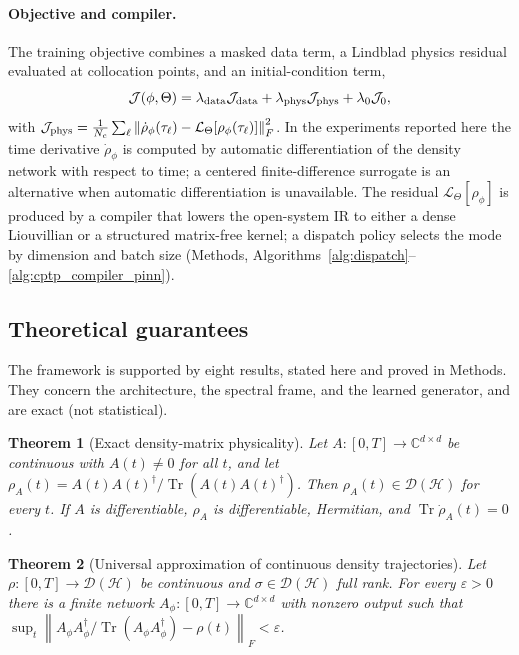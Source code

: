\documentclass[11pt]{article}
\newtheorem{theorem}{Theorem}
\DeclareMathOperator{\Tr}{Tr}
\newcommand{\C}{\mathbb{C}}
\newcommand{\calJ}{\mathcal{J}}
\newcommand{\calD}{\mathcal{D}}
\newcommand{\calL}{\mathcal{L}}
\newcommand{\eps}{\varepsilon}
\newcommand{\norm}[1]{\left\lVert #1 \right\rVert}
\newcommand{\hilb}{\mathcal{H}}
\newcommand{\rhophi}{\rho_{\phi}}
\begin{document}
\paragraph{Objective and compiler.}
The training objective combines a masked data term, a Lindblad physics residual evaluated at collocation points, and an initial-condition term,
\begin{equation}
    \calJ(\phi,\Theta)=\lambda_{\rm data}\calJ_{\rm data}+\lambda_{\rm phys}\calJ_{\rm phys}+\lambda_0\calJ_0,
    \label{eq:pinn_general_loss}
\end{equation}
with $\calJ_{\rm phys}=\tfrac1{N_c}\sum_\ell\norm{\dot\rhophi(\tau_\ell)-\calL_\Theta[\rhophi(\tau_\ell)]}_F^2$. In the experiments reported here the time derivative $\dot\rhophi$ is computed by automatic differentiation of the density network with respect to time; a centered finite-difference surrogate is an alternative when automatic differentiation is unavailable. The residual $\calL_\Theta[\rhophi]$ is produced by a compiler that lowers the open-system IR to either a dense Liouvillian or a structured matrix-free kernel; a dispatch policy selects the mode by dimension and batch size (Methods, Algorithms~\ref{alg:dispatch}--\ref{alg:cptp_compiler_pinn}).

\subsection{Theoretical guarantees}
\label{sec:guarantees}

The framework is supported by eight results, stated here and proved in Methods. They concern the architecture, the spectral frame, and the learned generator, and are exact (not statistical).

\begin{theorem}[Exact density-matrix physicality]
\label{thm:physicality}
Let $A:[0,T]\to\C^{d\times d}$ be continuous with $A(t)\ne0$ for all $t$, and let $\rho_A(t)=A(t)A(t)^\dagger/\Tr(A(t)A(t)^\dagger)$. Then $\rho_A(t)\in\calD(\hilb)$ for every $t$. If $A$ is differentiable, $\rho_A$ is differentiable, Hermitian, and $\Tr\dot\rho_A(t)=0$.
\end{theorem}

\begin{theorem}[Universal approximation of continuous density trajectories]
\label{thm:universal}
Let $\rho:[0,T]\to\calD(\hilb)$ be continuous and $\sigma\in\calD(\hilb)$ full rank. For every $\eps>0$ there is a finite network $A_\phi:[0,T]\to\C^{d\times d}$ with nonzero output such that $\sup_t\norm{A_\phi A_\phi^\dagger/\Tr(A_\phi A_\phi^\dagger)-\rho(t)}_F<\eps$.
\end{theorem}
\end{document}
